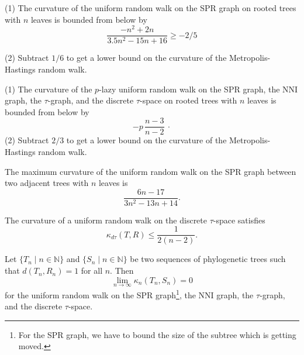 \documentclass{beamer}
\begin{document}
\begin{frame}{}
\begin{theorem}
\textup{(1)} The curvature of the uniform random walk on the SPR graph on rooted trees with $n$ leaves is bounded from below by
\vskip-3mm
	$$\frac{-n^2 + 2n}{3.5n^2 - 15n + 16} \geq -2/5$$

\textup{(2)} Subtract $1/6$ to get a lower bound on the curvature of the Metropolis-Hastings random walk.
\end{theorem}

\begin{theorem}
\textup{(1)} The curvature of the $p$-lazy uniform random walk on the SPR graph, the NNI graph, the $\tau$-graph, and the discrete $\tau$-space on rooted trees with $n$ leaves is bounded from below by
\vskip-3mm
\[
-p\,\frac{n-3}{n-2}~\cdot
\]
\textup{(2)} Subtract $2/3$ to get a lower bound on the curvature of the Metropolis-Hastings random walk.
\end{theorem}
\end{frame}

\begin{frame}{}
\begin{theorem}
The maximum curvature of the uniform random walk on the SPR graph between two adjacent trees with $n$ leaves is
\vskip-3mm
$$\frac{6n-17}{3n^2-13n+14}.$$
\end{theorem}

\begin{theorem}
The curvature of a uniform random walk on the discrete $\tau$-space satisfies
\vskip-5mm
\[
\kappa_{d\tau}(T,R) \leq
\dfrac{1}{2(n-2)}.
\]
\end{theorem}
\end{frame}

\begin{frame}{}

\begin{theorem}
Let $\{T_n \mid n \in \mathbb N\}$ and $\{S_n \mid n \in \mathbb N\}$ be two sequences of phylogenetic trees such that $d(T_n,R_n) = 1$ for all $n$.
Then $$\lim_{n \rightarrow \infty} \kappa_n(T_n,S_n) = 0$$ for the uniform random walk on the SPR
graph\footnote{For the SPR graph, we have to bound the size of the subtree which is getting moved.},
the NNI graph, the $\tau$-graph, and the discrete $\tau$-space.
\end{theorem}
\end{frame}
\end{document}
